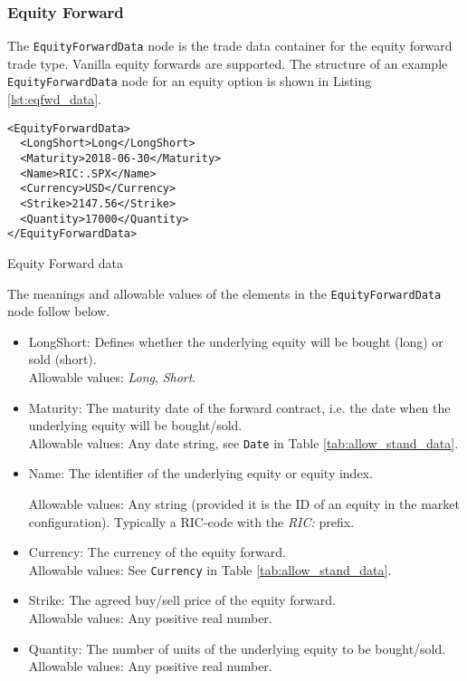 \subsubsection{Equity Forward}

The \lstinline!EquityForwardData!  node is the trade data container for the equity forward trade type.  Vanilla equity 
forwards are supported. The structure of an example \lstinline!EquityForwardData! node for an equity option is shown in 
Listing \ref{lst:eqfwd_data}.

\begin{listing}[H]
\begin{verbatim}
<EquityForwardData>
  <LongShort>Long</LongShort>
  <Maturity>2018-06-30</Maturity>
  <Name>RIC:.SPX</Name>
  <Currency>USD</Currency>
  <Strike>2147.56</Strike>
  <Quantity>17000</Quantity>
</EquityForwardData>
\end{verbatim}
\caption{Equity Forward data}
\label{lst:eqfwd_data}
\end{listing}

The meanings and allowable values of the elements in the \lstinline!EquityForwardData!  node follow below.

\begin{itemize}
	\item LongShort: Defines whether the underlying equity will be bought (long) or sold (short). \\
	Allowable values:  \emph{Long}, \emph{Short}.
	\item Maturity: The maturity date of the forward contract, i.e. the date when the underlying equity will be bought/sold. \\
	Allowable values: Any date string, see \lstinline!Date! in Table \ref{tab:allow_stand_data}.
	\item Name: The identifier of the underlying equity or equity index. 
	
	Allowable values:  Any string (provided it is the ID of an equity in the market configuration). Typically a RIC-code with the \emph{RIC:} prefix.
	\item Currency: The  currency of the equity forward. \\
	Allowable values:  See \lstinline!Currency! in Table \ref{tab:allow_stand_data}.	
	\item Strike: The agreed buy/sell price of the equity forward. \\
	Allowable values:  Any positive real number.	
	\item Quantity: The number of units of the underlying equity to be bought/sold. \\
	Allowable values:  Any positive real number.
\end{itemize}